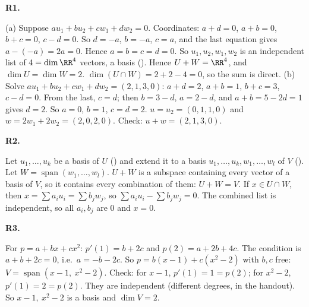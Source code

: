 \documentclass[10pt]{scrartcl}
\DeclareMathOperator{\spn}{span}
\begin{document}
\begin{prob}\textbf{R1.}\par{}
\begin{steps}
  \ii (a) Suppose $au_1+bu_2+cw_1+dw_2=0$. Coordinates: $a+d=0$, $a+b=0$, $b+c=0$, $c-d=0$. So $d=-a$, $b=-a$, $c=a$, and the last equation gives $a-(-a)=2a=0$. Hence $a=b=c=d=0$.
  \ii So $u_1,u_2,w_1,w_2$ is an independent list of $4=\dim\RR^4$ vectors, a basis (). Hence $U+W=\RR^4$, and $\dim U=\dim W=2$.
  \ii $\dim(U\cap W)=2+2-4=0$, so the sum is direct.
  \ii (b) Solve $au_1+bu_2+cw_1+dw_2=(2,1,3,0)$: $a+d=2$, $a+b=1$, $b+c=3$, $c-d=0$. From the last, $c=d$; then $b=3-d$, $a=2-d$, and $a+b=5-2d=1$ gives $d=2$. So $a=0$, $b=1$, $c=d=2$.
  \ii $u=u_2=(0,1,1,0)$ and $w=2w_1+2w_2=(2,0,2,0)$. Check: $u+w=(2,1,3,0)$.
\end{steps}
\end{prob}

\begin{prob}\textbf{R2.}\par{}
\begin{steps}
  \ii Let $u_1,\dots,u_k$ be a basis of $U$ () and extend it to a basis $u_1,\dots,u_k,w_1,\dots,w_l$ of $V$ (). Let $W=\spn(w_1,\dots,w_l)$.
  \ii $U+W$ is a subspace containing every vector of a basis of $V$, so it contains every combination of them: $U+W=V$.
  \ii If $x\in U\cap W$, then $x=\sum a_iu_i=\sum b_jw_j$, so $\sum a_iu_i-\sum b_jw_j=0$. The combined list is independent, so all $a_i,b_j$ are $0$ and $x=0$.
\end{steps}
\end{prob}

\begin{prob}\textbf{R3.}\par{}
\begin{steps}
  \ii For $p=a+bx+cx^2$: $p'(1)=b+2c$ and $p(2)=a+2b+4c$. The condition is $a+b+2c=0$, i.e.\ $a=-b-2c$.
  \ii So $p=b(x-1)+c(x^2-2)$ with $b,c$ free: $V=\spn(x-1,\ x^2-2)$. Check: for $x-1$, $p'(1)=1=p(2)$; for $x^2-2$, $p'(1)=2=p(2)$.
  \ii They are independent (different degrees,  in the handout). So $x-1,\ x^2-2$ is a basis and $\dim V=2$.
\end{steps}
\end{prob}
\end{document}
